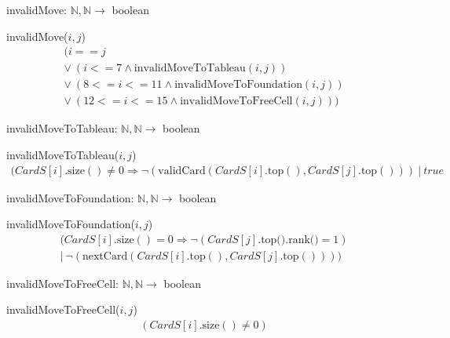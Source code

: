 \documentclass[12pt,fleqn]{article}
\begin{document}
\noindent invalidMove: $\mathbb{N}, \mathbb{N} \rightarrow$ boolean

\noindent invalidMove($\mathit{i, j}$)
\begin{gather*}
(i == j \\
\lor\ (i <= 7 \land \mbox{invalidMoveToTableau}(i, j)) \\
\lor\ (8 <= i <= 11 \land \mbox{invalidMoveToFoundation}(i, j)) \\
\lor\ (12 <= i <= 15 \land \mbox{invalidMoveToFreeCell}(i, j))) 
\end{gather*}


\noindent invalidMoveToTableau: $\mathbb{N}, \mathbb{N} \rightarrow$ boolean

\noindent invalidMoveToTableau($\mathit{i, j}$)
\begin{gather*}
(CardS[i].\mbox{size}() \neq 0 \Rightarrow \lnot (\mbox{validCard}(CardS[i].\mbox{top}(), CardS[j].\mbox{top}()))\ |\ true
\end{gather*}


\noindent invalidMoveToFoundation: $\mathbb{N}, \mathbb{N} \rightarrow$ boolean

\noindent invalidMoveToFoundation($\mathit{i, j}$)
\begin{gather*}
(CardS[i].\mbox{size}() = 0 \Rightarrow \lnot (CardS[j].\mbox{top().rank()} = 1)\\ |\ \lnot (\mbox{nextCard}(CardS[i].\mbox{top}(), CardS[j].\mbox{top}())))
\end{gather*}


\noindent invalidMoveToFreeCell: $\mathbb{N}, \mathbb{N} \rightarrow$ boolean

\noindent invalidMoveToFreeCell($\mathit{i, j}$)
\begin{gather*}
(CardS[i].\mbox{size}() \neq 0)
\end{gather*}
\newpage
\end{document}
